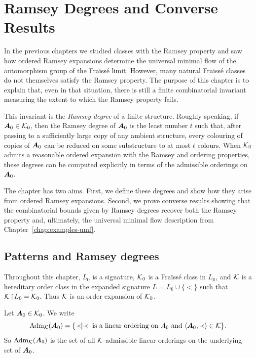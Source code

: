 \chapter{Ramsey Degrees and Converse Results}
\label{chap:ramsey-degrees}

In the previous chapters we studied classes with the Ramsey property and saw how ordered Ramsey expansions determine the universal minimal flow of the automorphism group of the Fraïssé limit. However, many natural Fraïssé classes do not themselves satisfy the Ramsey property. The purpose of this chapter is to explain that, even in that situation, there is still a finite combinatorial invariant measuring the extent to which the Ramsey property fails.

This invariant is the \emph{Ramsey degree} of a finite structure. Roughly speaking, if \(\boldsymbol{A}_0\in\mathcal{K}_0\), then the Ramsey degree of \(\boldsymbol{A}_0\) is the least number \(t\) such that, after passing to a sufficiently large copy of any ambient structure, every colouring of copies of \(\boldsymbol{A}_0\) can be reduced on some substructure to at most \(t\) colours. When \(\mathcal{K}_0\) admits a reasonable ordered expansion with the Ramsey and ordering properties, these degrees can be computed explicitly in terms of the admissible orderings on \(\boldsymbol{A}_0\).

The chapter has two aims. First, we define these degrees and show how they arise from ordered Ramsey expansions. Second, we prove converse results showing that the combinatorial bounds given by Ramsey degrees recover both the Ramsey property and, ultimately, the universal minimal flow description from Chapter~\ref{chap:examples-umf}.

\section{Patterns and Ramsey degrees}

Throughout this chapter, \(L_0\) is a signature, \(\mathcal{K}_0\) is a Fraïssé class in \(L_0\), and \(\mathcal{K}\) is a hereditary order class in the expanded signature \(L=L_0\cup\{<\}\) such that \(\mathcal{K}\!\restriction\!L_0=\mathcal{K}_0\).
Thus \(\mathcal{K}\) is an order expansion of \(\mathcal{K}_0\).

Let \(\boldsymbol{A}_0\in\mathcal{K}_0\). We write
\[
    \operatorname{Adm}_{\mathcal{K}}(\boldsymbol{A}_0)
    =
    \{\prec \mid \prec \text{ is a linear ordering on }A_0 \text{ and } \langle \boldsymbol{A}_0,\prec\rangle\in\mathcal{K}\}.
\]
So \(\operatorname{Adm}_{\mathcal{K}}(\boldsymbol{A}_0)\) is the set of all \(\mathcal{K}\)-admissible linear orderings on the underlying set of \(\boldsymbol{A}_0\).

